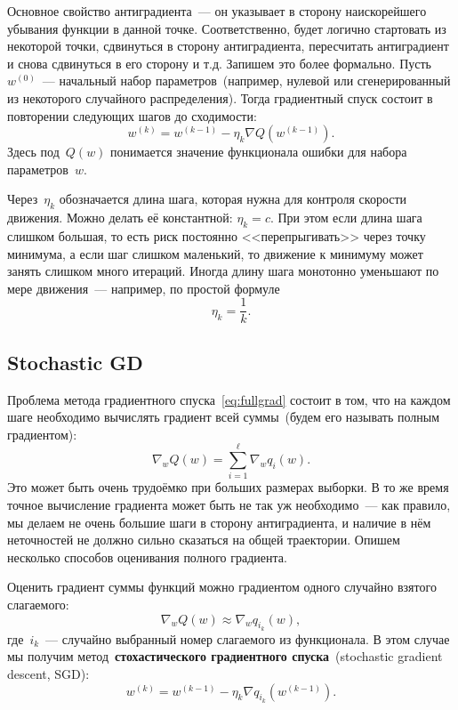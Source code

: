 \documentclass[a4paper, 12pt]{article}
\theoremstyle{plain} %
\theoremstyle{definition} %
\theoremstyle{remark} %
\begin{document}
Основное свойство антиградиента~--- он указывает в сторону наискорейшего убывания функции в данной точке.
Соответственно, будет логично стартовать из некоторой точки, сдвинуться в сторону антиградиента,
пересчитать антиградиент и снова сдвинуться в его сторону и т.д.
Запишем это более формально.
Пусть~$w^{(0)}$~--- начальный набор параметров~(например, нулевой или сгенерированный из некоторого
случайного распределения).
Тогда градиентный спуск состоит в повторении следующих шагов до сходимости:
\begin{equation}
\label{eq:fullgrad}
    w^{(k)}
    =
    w^{(k - 1)}
    -
    \eta_k
    \nabla Q(w^{(k - 1)}).
\end{equation}
Здесь под~$Q(w)$ понимается значение функционала ошибки для набора параметров~$w$.

Через~$\eta_k$ обозначается длина шага, которая нужна для контроля скорости движения.
Можно делать её константной: $\eta_k = c$.
При этом если длина шага слишком большая, то есть риск постоянно <<перепрыгивать>> через точку минимума,
а если шаг слишком маленький, то движение к минимуму может занять слишком много итераций.
Иногда длину шага монотонно уменьшают по мере движения~--- например, по простой формуле
\[
    \eta_k
    =
    \frac{1}{k}.
\]

\subsection{Stochastic GD}

Проблема метода градиентного спуска~\eqref{eq:fullgrad} состоит в том,
что на каждом шаге необходимо вычислять градиент всей суммы~(будем его называть полным градиентом):
\[
    \nabla_w Q(w)
    =
    \sum_{i = 1}^{\ell}
        \nabla_w q_i(w).
\]
Это может быть очень трудоёмко при больших размерах выборки.
В то же время точное вычисление градиента может быть не так уж необходимо~---
как правило, мы делаем не очень большие шаги в сторону антиградиента,
и наличие в нём неточностей не должно сильно сказаться на общей траектории.
Опишем несколько способов оценивания полного градиента.

Оценить градиент суммы функций можно градиентом одного случайно взятого слагаемого:
\[
    \nabla_w Q(w)
    \approx
    \nabla_w q_{i_k}(w),
\]
где~$i_k$~--- случайно выбранный номер слагаемого из функционала.
В этом случае мы получим метод~\textbf{стохастического
градиентного спуска}~(stochastic gradient descent, SGD):
\[
    w^{(k)} = w^{(k - 1)} - \eta_k \nabla q_{i_k}(w^{(k - 1)}).
\]
\end{document}
